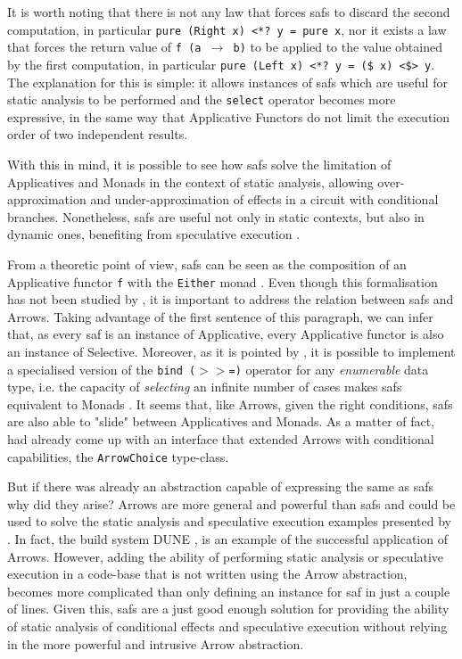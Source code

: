 \documentclass[
  oneside,
  11pt, a4paper,
  footinclude=true,
  headinclude=true,
  cleardoublepage=empty
]{scrbook}
\theoremstyle{definition}
\theoremstyle{definition}
\begin{document}
	It is worth noting that there is not any law that forces \glspl{saf} to discard the second computation, in particular \texttt{pure (Right x) <*? y = pure x}, nor it exists a law that forces the return value of \texttt{f (a $\rightarrow$ b)} to be applied to the value obtained by the first computation, in particular \texttt{pure (Left x) <*? y = (\$ x) <\$> y}. The explanation for this is simple: it allows instances of \glspl{saf} which are useful for static analysis to be performed and the \texttt{select} operator becomes more expressive, in the same way that Applicative Functors do not limit the execution order of two independent results.
	            
	With this in mind, it is possible to see how \glspl{saf} solve the limitation of Applicatives and Monads in the context of static analysis, allowing over-approximation and under-approximation of effects in a circuit with conditional branches. Nonetheless, \glspl{saf} are useful not only in static contexts, but also in dynamic ones, benefiting from speculative execution \citep{andrey2019selective}.
	            
	From a theoretic point of view, \glspl{saf} can be seen as the composition of an Applicative functor \texttt{f} with the \texttt{Either} monad \citep{andrey2019selective}. Even though this formalisation has not been studied by \cite{andrey2019selective}, it is important to address the relation between \glspl{saf} and Arrows. Taking advantage of the first sentence of this paragraph, we can infer that, as every \gls{saf} is an instance of Applicative, every Applicative functor is also an instance of Selective. Moreover, as it is pointed by \cite{andrey2019selective}, it is possible to implement a specialised version of the \texttt{bind ($>>$=)} operator for any \emph{enumerable} data type, i.e. the capacity of \emph{selecting} an infinite number of cases makes \glspl{saf} equivalent to Monads \citep{gist_2019}. It seems that, like Arrows, given the right conditions, \glspl{saf} are also able to "slide" between Applicatives and Monads. As a matter of fact, \cite{Hughes:2000:GMA:347238.347246} had already come up with an interface that extended Arrows with conditional capabilities, the \texttt{ArrowChoice} type-class.
	            
	But if there was already an abstraction capable of expressing the same as \glspl{saf} why did they arise? Arrows are more general and powerful than \glspl{saf} and could be used to solve the static analysis and speculative execution examples presented by \cite{andrey2019selective}. In fact, the build system DUNE \citep{dune_2018}, is an example of the successful application of Arrows. However, adding the ability of performing static analysis or speculative execution in a code-base that is not written using the Arrow abstraction, becomes more complicated than only defining an instance for \gls{saf} in just a couple of lines. Given this, \glspl{saf} are a just good enough solution for providing the ability of static analysis of conditional effects and speculative execution without relying in the more powerful and intrusive Arrow abstraction.
    
\end{document}
